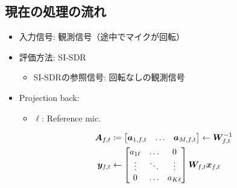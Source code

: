 \documentclass[twocolumn,9pt,dvipdfmx]{article}
\begin{document}
\subsection*{現在の処理の流れ}
\begin{itemize}
  \item 入力信号: 観測信号（途中でマイクが回転）
  \item 評価方法: SI-SDR
    \begin{itemize}
      \item SI-SDRの参照信号: 回転なしの観測信号
    \end{itemize}
  \item Projection back:
    \begin{itemize}
      \item $\ell$: Reference mic.
    \end{itemize}
    \begin{align}
      \Steer _{\ft} &\coloneqq \begin{bmatrix} \steer _{1,\ft} & \dots & \steer _{\Mic,\ft} \end{bmatrix} \gets \Demix _{\ft} ^{-1} \\
      \Est _{\ft} &\gets
      \begin{bmatrix}
        a _{1\ell} & \dots  & 0 \\
        \vdots     & \ddots & \vdots \\
        0          & \dots  & a _{\Src\ell}
      \end{bmatrix}
        \Demix _{\ft} \Obs _{\ft}
    \end{align}
\end{itemize}
\end{document}
